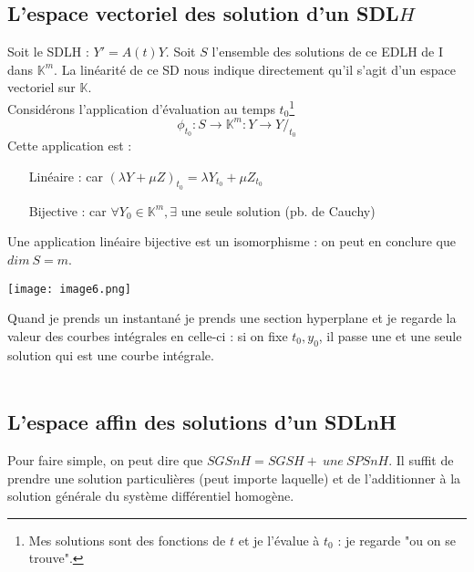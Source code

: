 \documentclass[11pt, a4paper, openany]{book}
\begin{document}
\subsection{L'espace vectoriel des solution d'un SDL$H$}
Soit le SDLH : $Y' = A(t)Y$. Soit $S$ l'ensemble des solutions de ce EDLH de I dans $\mathbb{K}^m$. La linéarité de ce SD nous indique directement qu'il s'agit d'un espace vectoriel sur $\mathbb{K}$.\\
Considérons l'application d'évaluation au temps $t_0$\footnote{Mes solutions sont des fonctions de $t$ et je l'évalue à $t_0$ : je regarde "ou on se trouve".}
\begin{equation}
	\phi_{t_0} : S \rightarrow \mathbb{K}^m : Y \rightarrow Y/_{t_0}
\end{equation}
Cette application est :
\begin{itemize}
	\item[Linéaire :] car $(\lambda Y + \mu Z)_{t_0} = \lambda Y_{t_0} + \mu Z_{t_0}$
	\item[Bijective :] car $\forall Y_0 \in \mathbb{K}^m, \exists$ une seule solution (pb. de Cauchy)
\end{itemize}
Une application linéaire bijective est un isomorphisme : on peut en conclure que $dim\ S = m$.\\
\begin{center}
	\texttt{[image: image6.png]}
\end{center}
		
Quand je prends un instantané je prends une section hyperplane et je regarde la valeur des courbes intégrales en celle-ci : si on fixe $t_0, y_0$, il passe une et une seule solution qui est une courbe intégrale.\\
		
\ \\
		
		
\subsection{L'espace affin des solutions d'un SDLnH}
Pour faire simple, on peut dire que $SGSnH = SGSH +\ une\ SPSnH$. Il suffit de prendre une solution particulières (peut importe laquelle) et de l'additionner à la solution générale du système différentiel homogène.
		
\end{document}
